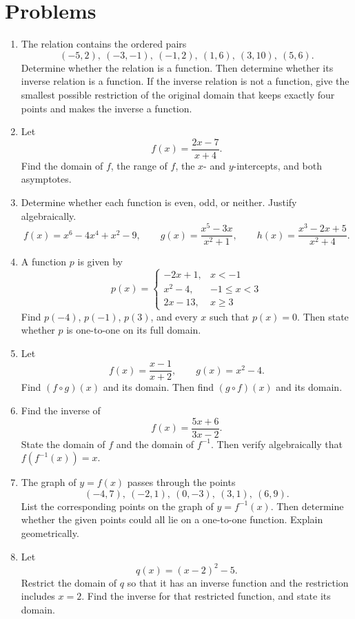 \documentclass[12pt]{article}
\begin{document}
\section*{Problems}
\begin{enumerate}[leftmargin=*, itemsep=1.1em, topsep=0.8em]
  \item The relation contains the ordered pairs
  \[
  (-5,2),\ (-3,-1),\ (-1,2),\ (1,6),\ (3,10),\ (5,6).
  \]
  Determine whether the relation is a function. Then determine whether its inverse relation is a function. If the inverse relation is not a function, give the smallest possible restriction of the original domain that keeps exactly four points and makes the inverse a function.

  \item Let
  \[
  f(x)=\frac{2x-7}{x+4}.
  \]
  Find the domain of $f$, the range of $f$, the $x$- and $y$-intercepts, and both asymptotes.

  \item Determine whether each function is even, odd, or neither. Justify algebraically.
  \[
  f(x)=x^6-4x^4+x^2-9,\qquad
  g(x)=\frac{x^5-3x}{x^2+1},\qquad
  h(x)=\frac{x^3-2x+5}{x^2+4}.
  \]

  \item A function $p$ is given by
  \[
  p(x)=
  \begin{cases}
  -2x+1, & x<-1\\
  x^2-4, & -1\le x<3\\
  2x-13, & x\ge 3
  \end{cases}
  \]
  Find $p(-4)$, $p(-1)$, $p(3)$, and every $x$ such that $p(x)=0$. Then state whether $p$ is one-to-one on its full domain.

  \item Let
  \[
  f(x)=\frac{x-1}{x+2},\qquad g(x)=x^2-4.
  \]
  Find $(f\circ g)(x)$ and its domain. Then find $(g\circ f)(x)$ and its domain.

  \item Find the inverse of
  \[
  f(x)=\frac{5x+6}{3x-2}.
  \]
  State the domain of $f$ and the domain of $f^{-1}$. Then verify algebraically that $f(f^{-1}(x))=x$.

  \item The graph of $y=f(x)$ passes through the points
  \[
  (-4,7),\ (-2,1),\ (0,-3),\ (3,1),\ (6,9).
  \]
  List the corresponding points on the graph of $y=f^{-1}(x)$. Then determine whether the given points could all lie on a one-to-one function. Explain geometrically.

  \item Let
  \[
  q(x)=(x-2)^2-5.
  \]
  Restrict the domain of $q$ so that it has an inverse function and the restriction includes $x=2$. Find the inverse for that restricted function, and state its domain.


\end{enumerate}
\end{document}

